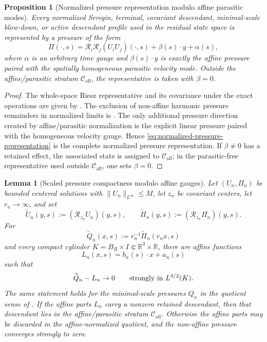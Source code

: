 \documentclass[11pt]{amsart}
\numberwithin{equation}{section}
\theoremstyle{plain}
\newtheorem{proposition}[theorem]{Proposition}
\newtheorem{lemma}[theorem]{Lemma}
\theoremstyle{definition}
\theoremstyle{remark}
\newcommand{\calR}{\mathcal R}
\newcommand{\Caff}{\mathcal C_{\mathrm{aff}}}
\begin{document}
\begin{proposition}[Normalized pressure representation modulo affine parasitic modes]
\label{lem:normalized-pressure-representation}
\label{prop:normalized-pressure-representation}
Every normalized Seregin, terminal, covariant descendant, minimal-scale
blow-down, or active descendant profile used in the residual state space is
represented by a pressure of the form
\begin{equation}\label{eq:normalized-pressure-representation}
   \Pi(\cdot,s)
   =
   \mathcal R_i\mathcal R_j(U_iU_j)(\cdot,s)
   +\beta(s)\cdot y+\alpha(s),
\end{equation}
where \(\alpha\) is an arbitrary time gauge and
\(\beta(s)\cdot y\) is exactly the affine pressure paired with the spatially
homogeneous parasitic velocity mode.  Outside the affine/parasitic stratum
\(\Caff\), the representative is taken with \(\beta=0\).
\end{proposition}

\begin{proof}
The whole-space Riesz representative and its covariance under the exact
operations are given by
.  The exclusion of
non-affine harmonic pressure remainders in normalized limits is
.  The only additional pressure
direction created by affine/parasitic normalization is the explicit linear
pressure paired with the homogeneous velocity gauge.  Hence
\eqref{eq:normalized-pressure-representation} is the complete normalized
pressure representation.  If \(\beta\ne0\) has a retained effect, the
associated state is assigned to \(\Caff\); in the parasitic-free representative
used outside \(\Caff\), one sets \(\beta=0\).
\end{proof}

\begin{lemma}[Scaled pressure compactness modulo affine gauges]
\label{lem:scaled-pressure-compactness-affine}
Let \((U_n,\Pi_n)\) be bounded centered solutions with
\(\|U_n\|_{L^\infty}\le M\), let \(z_n\) be covariant centers, let
\(r_n\to\infty\), and set
\[
   \widetilde U_n(y,s):=(\calR_{z_n}U_n)(y,s),
   \qquad
   \widetilde\Pi_n(y,s):=(\calR_{z_n}\Pi_n)(y,s).
\]
For
\[
   \widetilde Q_n(x,s):=r_n^{-1}\widetilde\Pi_n(r_nx,s)
\]
and every compact cylinder
\(K=B_R\times I\Subset\mathbb R^3\times\mathbb R\), there are affine functions
\[
   L_n(x,s)=b_n(s)\cdot x+a_n(s)
\]
such that
\begin{equation}\label{eq:scaled-pressure-compactness-affine}
   \widetilde Q_n-L_n\to0
   \qquad\hbox{strongly in }L^{3/2}(K).
\end{equation}
The same statement holds for the minimal-scale pressures \(Q_n\) in the quotient
sense of .  If the affine parts
\(L_n\) carry a nonzero retained descendant, then that descendant lies in the
affine/parasitic stratum \(\Caff\).  Otherwise the affine parts may be
discarded in the affine-normalized quotient, and the non-affine pressure
converges strongly to zero.
\end{lemma}
\end{document}
